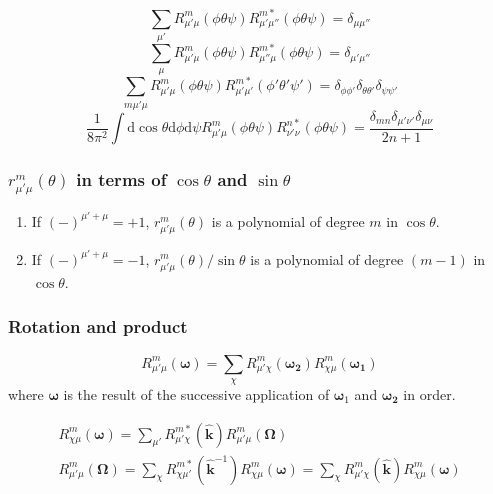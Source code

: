 \begin{equation}
\sum_{\mu'}R_{\mu'\mu}^{m}(\phi\theta\psi)R_{\mu'\mu''}^{m*}(\phi\theta\psi)=\delta_{\mu\mu''}
\end{equation}
\begin{equation}
\sum_{\mu}R_{\mu'\mu}^{m}(\phi\theta\psi)R_{\mu''\mu}^{m*}(\phi\theta\psi)=\delta_{\mu'\mu''}
\end{equation}
\begin{equation}
\sum_{m\mu'\mu}R_{\mu'\mu}^{m}(\phi\theta\psi)R_{\mu'\mu'}^{m*}(\phi'\theta'\psi')=\delta_{\phi\phi'}\delta_{\theta\theta'}\delta_{\psi\psi'}
\end{equation}
\begin{equation}
\frac{1}{8\pi^{2}}\int\mathrm{d}\cos\theta\mathrm{d}\phi\mathrm{d}\psi R_{\mu'\mu}^{m}(\phi\theta\psi)R_{\nu'\nu}^{n*}(\phi\theta\psi)=\frac{\delta_{mn}\delta_{\mu'\nu'}\delta_{\mu\nu}}{2n+1}\label{eq:gsh-orthogonality}
\end{equation}



\subsubsection*{$r_{\mu'\mu}^{m}(\theta)$ in terms of $\cos\theta$ and $\sin\theta$}
\begin{enumerate}
\item If $\left(-\right)^{\mu'+\mu}=+1$, $r_{\mu'\mu}^{m}(\theta)$ is
a polynomial of degree $m$ in $\cos\theta$.
\item If $\left(-\right)^{\mu'+\mu}=-1$, $r_{\mu'\mu}^{m}(\theta)/\sin\theta$
is a polynomial of degree $(m-1)$ in $\cos\theta$.
\end{enumerate}

\subsubsection*{Rotation and product}

\begin{equation}
R_{\mu'\mu}^{m}(\boldsymbol{\omega})=\sum_{\chi}R_{\mu'\chi}^{m}(\boldsymbol{\omega_{2}})R_{\chi\mu}^{m}(\boldsymbol{\omega_{1}})
\end{equation}
where $\boldsymbol{\omega}$ is the result of the successive application
of $\boldsymbol{\omega}_{1}$ and $\boldsymbol{\omega_{2}}$ in order.

\begin{equation}
\begin{array}{c}
{\displaystyle R_{\chi\mu}^{m}(\boldsymbol{\omega})=\sum_{\mu'}R_{\mu'\chi}^{m*}(\hat{\mathbf{k}})R_{\mu'\mu}^{m}(\mathbf{\Omega})}\\
{\displaystyle R_{\mu'\mu}^{m}(\mathbf{\Omega})=\sum_{\chi}R_{\chi\mu'}^{m*}(\hat{\mathbf{k}}^{-1})R_{\chi\mu}^{m}(\boldsymbol{\omega})=\sum_{\chi}R_{\mu'\chi}^{m}(\hat{\mathbf{k}})R_{\chi\mu}^{m}(\boldsymbol{\omega})}
\end{array}\label{eq:gsh-rotation}
\end{equation}



